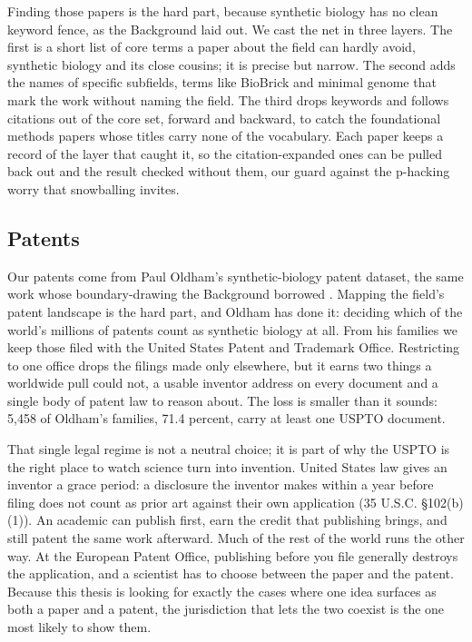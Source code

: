 \documentclass[12pt,a4paper]{article}
\begin{document}
	Finding those papers is the hard part, because synthetic biology has no clean keyword fence, as the Background laid out. We cast the net in three layers. The first is a short list of core terms a paper about the field can hardly avoid, synthetic biology and its close cousins; it is precise but narrow. The second adds the names of specific subfields, terms like BioBrick and minimal genome that mark the work without naming the field. The third drops keywords and follows citations out of the core set, forward and backward, to catch the foundational methods papers whose titles carry none of the vocabulary. Each paper keeps a record of the layer that caught it, so the citation-expanded ones can be pulled back out and the result checked without them, our guard against the p-hacking worry that snowballing invites.
	
	\subsection{Patents}
	
	Our patents come from Paul Oldham's synthetic-biology patent dataset, the same work whose boundary-drawing the Background borrowed \parencite{oldhamSyntheticBiologyMapping2018}. Mapping the field's patent landscape is the hard part, and Oldham has done it: deciding which of the world's millions of patents count as synthetic biology at all. From his families we keep those filed with the United States Patent and Trademark Office. Restricting to one office drops the filings made only elsewhere, but it earns two things a worldwide pull could not, a usable inventor address on every document and a single body of patent law to reason about. The loss is smaller than it sounds: 5,458 of Oldham's families, 71.4 percent, carry at least one USPTO document.

That single legal regime is not a neutral choice; it is part of why the USPTO is the right place to watch science turn into invention. United States law gives an inventor a grace period: a disclosure the inventor makes within a year before filing does not count as prior art against their own application (35 U.S.C. \S 102(b)(1)). An academic can publish first, earn the credit that publishing brings, and still patent the same work afterward. Much of the rest of the world runs the other way. At the European Patent Office, publishing before you file generally destroys the application, and a scientist has to choose between the paper and the patent. Because this thesis is looking for exactly the cases where one idea surfaces as both a paper and a patent, the jurisdiction that lets the two coexist is the one most likely to show them.
	
\end{document}
